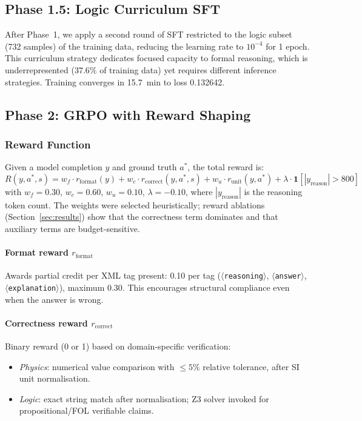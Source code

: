 \documentclass{ieeeaccess}
\begin{document}
\subsection{Phase 1.5: Logic Curriculum SFT}

After Phase~1, we apply a second round of SFT restricted to the
logic subset (732 samples) of the training data, reducing the learning rate
to $10^{-4}$ for 1 epoch.
This curriculum strategy dedicates focused capacity to formal reasoning,
which is underrepresented ($37.6\%$ of training data) yet requires different
inference strategies.
Training converges in 15.7~min to loss 0.132642.

\subsection{Phase 2: GRPO with Reward Shaping}

\subsubsection{Reward Function}

Given a model completion $y$ and ground truth $a^*$, the total reward is:
\begin{equation}
  R(y, a^*, s) =
    w_f \cdot r_{\text{format}}(y)
  + w_c \cdot r_{\text{correct}}(y, a^*, s)
  + w_u \cdot r_{\text{unit}}(y, a^*)
  + \lambda \cdot \mathbf{1}[|y_{\text{reason}}| > 800]
  \label{eq:reward}
\end{equation}
with $w_f = 0.30$, $w_c = 0.60$, $w_u = 0.10$, $\lambda = -0.10$,
where $|y_{\text{reason}}|$ is the reasoning token count.
The weights were selected heuristically; reward ablations
(Section~\ref{sec:results}) show that the correctness term dominates
and that auxiliary terms are budget-sensitive.

\paragraph{Format reward $r_{\text{format}}$}
Awards partial credit per XML tag present: 0.10 per tag
($\langle$\texttt{reasoning}$\rangle$, $\langle$\texttt{answer}$\rangle$,
$\langle$\texttt{explanation}$\rangle$), maximum 0.30.
This encourages structural compliance even when the answer is wrong.

\paragraph{Correctness reward $r_{\text{correct}}$}
Binary reward (0 or 1) based on domain-specific verification:
\begin{itemize}
  \item \emph{Physics}: numerical value comparison with
        $\leq 5\%$ relative tolerance, after SI unit normalisation.
  \item \emph{Logic}: exact string match after normalisation; Z3 solver
        invoked for propositional/FOL verifiable claims.
\end{itemize}
\end{document}
